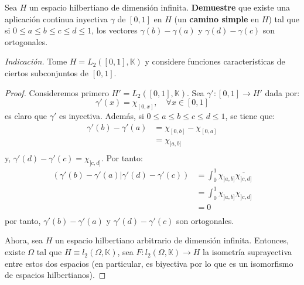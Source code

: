 \documentclass[12pt]{report}
\theoremstyle{largebreak}
\newcommand\cf[3]{\ensuremath{#1:#2\rightarrow#3}}
\newcommand\pint[2]{\ensuremath{\left(#1\big|#2\right)}}
\newcommand\conj[1]{\ensuremath{\overline{#1}}}
\begin{document}
    \begin{excer}
        Sea $H$ un espacio hilbertiano de dimensión infinita. \textbf{Demuestre} que existe una aplicación continua inyectiva $\gamma$ de $[0,1]$ en $H$ (un \textbf{camino simple} en $H$) tal que si $0\leq a\leq b\leq c\leq d\leq 1$, los vectores $\gamma(b)-\gamma(a)$ y $\gamma(d)-\gamma(c)$ son ortogonales.

        \textit{Indicación.} Tome $H=L_2([0,1],\mathbb{K})$ y considere funciones características de ciertos subconjuntos de $[0,1]$.
    \end{excer}

    \begin{proof}
        Consideremos primero $H'=L_2([0,1],\mathbb{K})$. Sea $\cf{\gamma'}{[0,1]}{H'}$ dada por:
        \begin{equation*}
            \gamma'(x)=\chi_{[0,x]},\quad\forall x\in[0,1]
        \end{equation*}
        es claro que $\gamma'$ es inyectiva. Además, si $0\leq a\leq b\leq c\leq d\leq 1$, se tiene que:
        \begin{equation*}
            \begin{split}
                \gamma'(b)-\gamma'(a)&=\chi_{[0,b]}-\chi_{[0,a]}\\
                &=\chi_{]a,b]}\\
            \end{split}
        \end{equation*}
        y, $\gamma'(d)-\gamma'(c)=\chi_{]c,d]}$. Por tanto:
        \begin{equation*}
            \begin{split}
                \pint{\gamma'(b)-\gamma'(a)}{\gamma'(d)-\gamma'(c)}&=\int_{0}^{1}\chi_{]a,b]}\conj{\chi_{]c,d]}}\\
                &=\int_{0}^{1}\chi_{]a,b]}\chi_{]c,d]}\\
                &=0\\
            \end{split}
        \end{equation*}
        por tanto, $\gamma'(b)-\gamma'(a)$ y $\gamma'(d)-\gamma'(c)$ son ortogonales.

        Ahora, sea $H$ un espacio hilbertiano arbitrario de dimensión infinita. Entonces, existe $\Omega$ tal que $H\equiv l_2(\Omega,\mathbb{K})$, sea $\cf{F}{l_2(\Omega,\mathbb{K})}{H}$ la isometría suprayectiva entre estos dos espacios (en particular, es biyectiva por lo que es un isomorfismo de espacios hilbertianos).
        

\end{proof}
\end{document}
